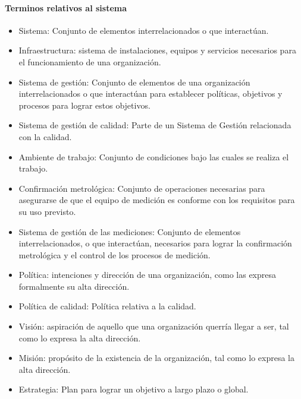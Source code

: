 		\paragraph{Terminos relativos al sistema}
			\begin{itemize}
				\item Sistema: Conjunto de elementos interrelacionados o que interactúan.
				
				\item Infraestructura: sistema de instalaciones, equipos y servicios necesarios para el
				funcionamiento de una organización.
				
				\item Sistema de gestión: Conjunto de elementos de una organización interrelacionados o que interactúan para establecer políticas, objetivos y procesos para lograr estos objetivos.
				
				\item Sistema de gestión de calidad: Parte de un Sistema de Gestión relacionada con la calidad.
				
				\item Ambiente de trabajo: Conjunto de condiciones bajo las cuales se realiza el trabajo.
				
				\item Confirmación metrológica: Conjunto de operaciones necesarias para asegurarse de que el equipo de medición es
				conforme con los requisitos para su uso previsto. 
				
				\item Sistema de gestión de las mediciones: Conjunto de elementos interrelacionados, o que interactúan, necesarios para lograr la confirmación
				metrológica y el control de los procesos de medición.
				
				\item Política: intenciones y dirección de una organización, como las expresa formalmente
				su alta dirección.
				
				\item Política de calidad: Política relativa a la calidad. 
				
				\item Visión: aspiración de aquello que una organización querría llegar a ser, tal como lo expresa la alta dirección.
				
				\item Misión: propósito de la existencia de la organización, tal como lo expresa la alta dirección.
				
				\item Estrategia: Plan para lograr un objetivo a largo plazo o global.
			\end{itemize}
		
